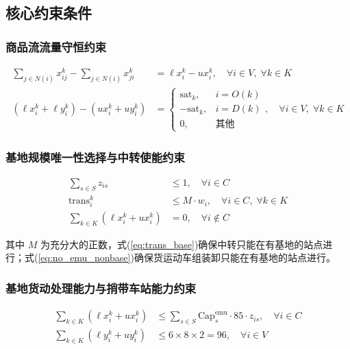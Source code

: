 \documentclass[12pt,a4paper,fontset=none]{ctexart}
\begin{document}
\subsection{核心约束条件}

\subsubsection{商品流流量守恒约束}

\begin{align}
\sum_{j \in N(i)} x_{ij}^k - \sum_{j \in N(i)} x_{ji}^k &= \ell x_i^k - ux_i^k, \quad \forall i \in V,\; \forall k \in K \label{eq:flow_x}\\
(\ell x_i^k + \ell y_i^k) - (ux_i^k + uy_i^k) &=
\begin{cases}
\text{sat}_k, & i = O(k)\\
-\text{sat}_k, & i = D(k)\\
0, & \text{其他}
\end{cases}, \quad \forall i \in V,\; \forall k \in K \label{eq:flow_total}
\end{align}

\subsubsection{基地规模唯一性选择与中转使能约束}

\begin{align}
\sum_{s \in S} z_{is} &\leq 1, \quad \forall i \in C \label{eq:one_scale}\\
\text{trans}_i^k &\leq M \cdot w_i, \quad \forall i \in C,\; \forall k \in K \label{eq:trans_base}\\
\sum_{k \in K} (\ell x_i^k + ux_i^k) &= 0, \quad \forall i \notin C \label{eq:no_emu_nonbase}
\end{align}

其中 $M$ 为充分大的正数，式(\ref{eq:trans_base})确保中转只能在有基地的站点进行；式(\ref{eq:no_emu_nonbase})确保货运动车组装卸只能在有基地的站点进行。

\subsubsection{基地货动处理能力与捎带车站能力约束}

\begin{align}
\sum_{k \in K} (\ell x_i^k + ux_i^k) &\leq \sum_{s \in S} \text{Cap}_s^{\text{emu}} \cdot 85 \cdot z_{is}, \quad \forall i \in C \label{eq:base_cap}\\
\sum_{k \in K} (\ell y_i^k + uy_i^k) &\leq 6 \times 8 \times 2 = 96,\quad \forall i \in V \label{eq:piggy_cap}
\end{align}
\end{document}
